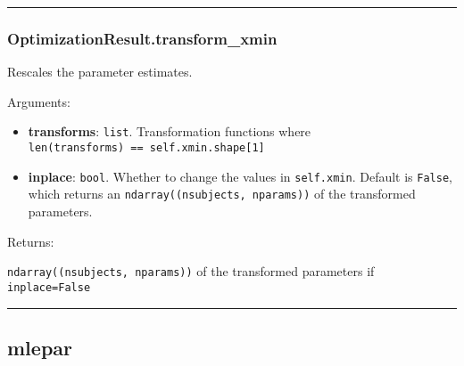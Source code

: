 \begin{center}\rule{0.5\linewidth}{\linethickness}\end{center}

\subsubsection{OptimizationResult.transform\_xmin}\label{optimizationresult.transform_xmin}

\begin{Shaded}
\begin{Highlighting}[]
\OperatorTok{=}\NormalTok{)}
\end{Highlighting}
\end{Shaded}

Rescales the parameter estimates.

Arguments:

\begin{itemize}
\tightlist
\item
  \textbf{transforms}: \texttt{list}. Transformation functions where
  \texttt{len(transforms)\ ==\ self.xmin.shape{[}1{]}}
\item
  \textbf{inplace}: \texttt{bool}. Whether to change the values in
  \texttt{self.xmin}. Default is \texttt{False}, which returns an
  \texttt{ndarray((nsubjects,\ nparams))} of the transformed parameters.
\end{itemize}

Returns:

\texttt{ndarray((nsubjects,\ nparams))} of the transformed parameters if
\texttt{inplace=False}

\begin{center}\rule{0.5\linewidth}{\linethickness}\end{center}

\subsection{mlepar}\label{mlepar}

\begin{Shaded}
\begin{Highlighting}[]
\OperatorTok{=}\OperatorTok{=}\OperatorTok{=}\OperatorTok{=-}\NormalTok{)}
\end{Highlighting}
\end{Shaded}

